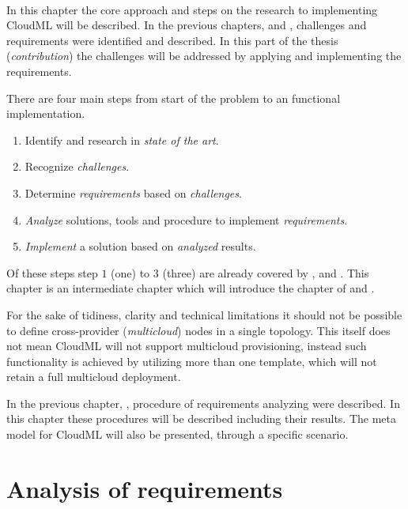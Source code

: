 




 \\
In this chapter the core approach and steps on the research to implementing CloudML will be described.
In the previous chapters,  and , 
challenges and requirements were identified and described.
In this part of the thesis (\emph{contribution}) the challenges will be addressed 
by applying and implementing the requirements.

There are four main steps from start of the problem to an functional implementation.
\begin{enumerate}
  \item Identify and research in \emph{state of the art}.
  \item Recognize \emph{challenges}.
  \item Determine \emph{requirements} based on \emph{challenges}.
  \item \emph{Analyze} solutions, tools and procedure to implement \emph{requirements}.
  \item \emph{Implement} a solution based on \emph{analyzed} results.
\end{enumerate}
Of these steps step $1$ (one) to $3$ (three) are already covered by 
,  and .
This chapter is an intermediate chapter which will introduce the chapter of 
and .


For the sake of tidiness, clarity and technical limitations it 
should not be possible to define cross-provider (\emph{multicloud}) nodes in a single topology.
This itself does not mean CloudML will not support multicloud provisioning,
instead such functionality is achieved by utilizing more than one template,
which will not retain a full multicloud deployment.

\hr

In the previous chapter, , procedure of requirements analyzing
were described.
In this chapter these procedures will be described including their results.
The meta model for CloudML will also be presented, through a specific scenario.

\section{Analysis of requirements}


